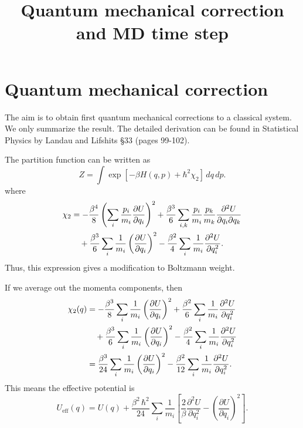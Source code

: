 \documentclass{article}
\begin{document}
\title{Quantum mechanical correction and MD time step}
\author{ \vspace{-10ex} }
\date{ \vspace{-10ex} }
\maketitle


\section{Quantum mechanical correction}


The aim is to obtain first quantum mechanical corrections
to a classical system.
%
We only summarize the result.
%
The detailed derivation can be found in
Statistical Physics by Landau and Lifshits \S 33 (pages 99-102).


The partition function can be written as
\begin{equation}
Z = \int
\exp\left[-\beta H(q, p) + \hbar^2 \chi_2 \right] \, dq \, dp.
\end{equation}
where
\begin{align}
\chi_2
&=
-\frac{ \beta^4 } { 8 }
\left(
  \sum_i \frac{p_i}{m_i} \frac{\partial U}{\partial q_i}
\right)^2
+\frac{ \beta^3 } { 6 }
\sum_{i,k} \frac{p_i}{m_i} \frac{p_k}{m_k}
  \frac{\partial^2 U}{\partial q_i \partial q_k}
  \notag \\
&\quad
+\frac{ \beta^3 }{6}
  \sum_i \frac{1}{m_i}
    \left( \frac{ \partial U } { \partial q_i } \right)^2
-\frac{ \beta^2 }{4}
  \sum_i \frac{1}{m_i}
    \frac{ \partial^2 U } { \partial q_i^2 }.
\end{align}
Thus, this expression gives a modification to Boltzmann weight.

If we average out the momenta components, then
\begin{align}
\chi_2(q)
&=
-\frac{ \beta^3 } { 8 }
  \sum_i \frac{1}{m_i} \left( \frac{\partial U}{\partial q_i} \right)^2
+\frac{ \beta^2 } { 6 }
\sum_{i} \frac{1}{m_i}
  \frac{\partial^2 U}{\partial q_i^2}
  \notag \\
&\quad
+\frac{ \beta^3 }{6}
  \sum_i \frac{1}{m_i}
    \left( \frac{ \partial U } { \partial q_i } \right)^2
-\frac{ \beta^2 }{4}
  \sum_i \frac{1}{m_i}
    \frac{ \partial^2 U } { \partial q_i^2 }
\notag \\
&=
\frac{ \beta^3 }{24}
  \sum_i \frac{1}{m_i}
    \left( \frac{ \partial U } { \partial q_i } \right)^2
-\frac{ \beta^2 }{12}
  \sum_i \frac{1}{m_i}
    \frac{ \partial^2 U } { \partial q_i^2 }.
\end{align}
This means the effective potential is
%
\begin{equation}
U_{\mathrm{eff}}(q)
=
U(q)
+
\frac{ \beta^2 \, \hbar^2 }{24}
\sum_i \frac{1}{m_i}
\left[
    \frac{2}{\beta}
    \frac{ \partial^2 U } { \partial q_i^2 }
-
    \left( \frac{ \partial U } { \partial q_i } \right)^2
\right].
\label{eq:Ueff}
\end{equation}
\end{document}

